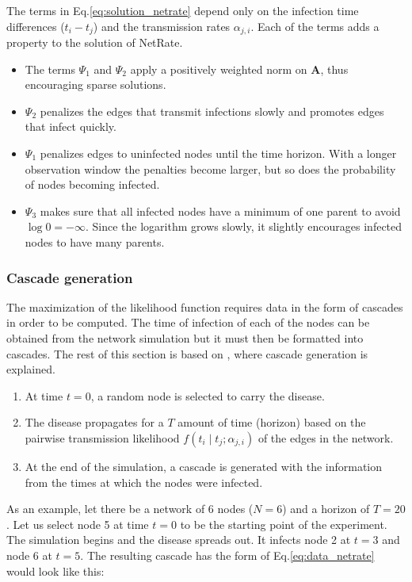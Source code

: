 \documentclass[11pt]{article}
\begin{document}
The terms in Eq.\ref{eq:solution_netrate} depend only on the infection time differences ($t_{i}-t_{j}$) and the transmission rates $\alpha_{j,i}$. Each of the terms adds a property to the solution of NetRate.

\begin{itemize}
\item The terms $\Psi_{1}$ and $\Psi_{2}$ apply a positively weighted norm on $\textbf{A}$, thus encouraging sparse solutions.
\item $\Psi_{2}$ penalizes the edges that transmit infections slowly and promotes edges that infect quickly.
\item $\Psi_{1}$ penalizes edges to uninfected nodes until the time horizon. With a longer observation window the penalties become larger, but so does the probability of nodes becoming infected.
\item $\Psi_{3}$ makes sure that all infected nodes have a minimum of one parent to avoid $\log 0 = -\infty$. Since the logarithm grows slowly, it slightly encourages infected nodes to have many parents.
\end{itemize}

\subsubsection{Cascade generation}\label{sec:cascade_generation}

The maximization of the likelihood function requires data in the form of cascades in order to be computed. The time of infection of each of the nodes can be obtained from the network simulation but it must then be formatted into cascades. The rest of this section is based on \cite{pranav_report}, where cascade generation is explained. 

\begin{enumerate}
\item At time $t=0$, a random node is selected to carry the disease.
\item The disease propagates for a $T$ amount of time (horizon) based on the pairwise transmission likelihood $f(t_{i}\mid t_{j};\alpha_{j,i})$ of the edges in the network.
\item At the end of the simulation, a cascade is generated with the information from the times at which the nodes were infected. 
\end{enumerate}

As an example, let there be a network of 6 nodes ($N=6$) and a horizon of $T=20$. Let us select node 5 at time $t=0$ to be the starting point of the experiment. The simulation begins and the disease spreads out. It infects node 2 at $t=3$ and node 6 at $t=5$. The resulting cascade has the form of Eq.\ref{eq:data_netrate}  would look like this:
\end{document}

